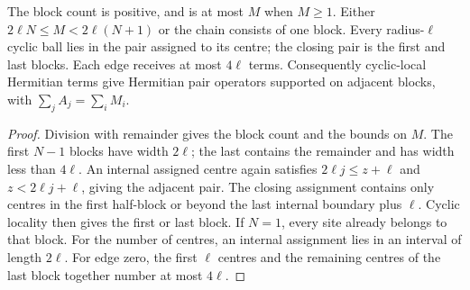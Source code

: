 \begin{lemma}
    \label{thm:hastings_rounded_periodic_grouping}
    \leanok
    The block count is positive, and is at most $M$ when $M\ge1$.
    Either $2\ell N\le M<2\ell(N+1)$ or the chain consists of one
    block. Every radius-$\ell$ cyclic ball lies in the pair assigned
    to its centre; the closing pair is the first and last blocks.
    Each edge receives at most $4\ell$ terms. Consequently cyclic-local
    Hermitian terms give Hermitian pair operators supported on adjacent
    blocks, with $\sum_jA_j=\sum_iM_i$.
\end{lemma}
\begin{proof}\leanok
    Division with remainder gives the block count and the bounds on
    $M$. The first $N-1$ blocks have width $2\ell$; the last contains
    the remainder and has width less than $4\ell$. An internal assigned
    centre again satisfies $2\ell j\le z+\ell$ and
    $z<2\ell j+\ell$, giving the adjacent pair. The closing assignment
    contains only centres in the first half-block or beyond the last
    internal boundary plus $\ell$. Cyclic locality then gives the first
    or last block. If $N=1$, every site already belongs to that block.
    For the number of centres, an internal assignment lies in an interval
    of length $2\ell$. For edge zero, the first $\ell$ centres and the
    remaining centres of the last block together number at most $4\ell$.
\end{proof}

